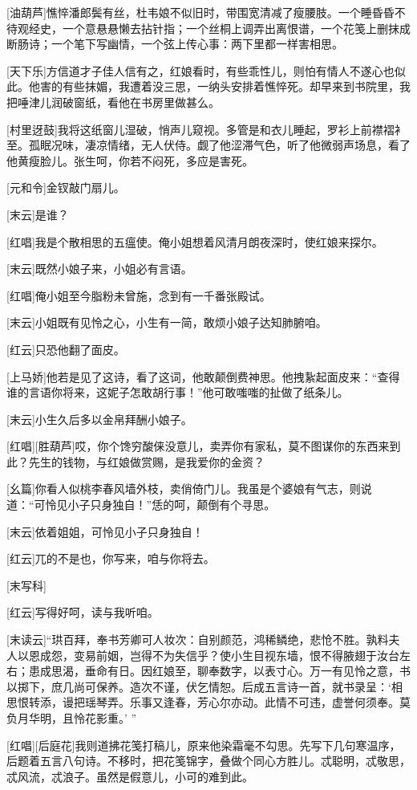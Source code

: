 \documentclass{book}
\begin{document}
[油葫芦]憔悴潘郎鬓有丝，杜韦娘不似旧时，带围宽清减了瘦腰肢。一个睡昏昏不待观经史，一个意悬悬懒去拈针指；一个丝桐上调弄出离恨谱，一个花笺上删抹成断肠诗；一个笔下写幽情，一个弦上传心事：两下里都一样害相思。

[天下乐]方信道才子佳人信有之，红娘看时，有些乖性儿，则怕有情人不遂心也似此。他害的有些抹媚，我遭着没三思，一纳头安排着憔悴死。却早来到书院里，我把唾津儿润破窗纸，看他在书房里做甚么。

[村里迓鼓]我将这纸窗儿湿破，悄声儿窥视。多管是和衣儿睡起，罗衫上前襟褶衤至。孤眠况味，凄凉情绪，无人伏侍。觑了他涩滞气色，听了他微弱声场息，看了他黄瘦脸儿。张生呵，你若不闷死，多应是害死。

[元和令]金钗敲门扇儿。

[末云]是谁？

[红唱]我是个散相思的五瘟使。俺小姐想着风清月朗夜深时，使红娘来探尔。

[末云]既然小娘子来，小姐必有言语。

[红唱]俺小姐至今脂粉未曾施，念到有一千番张殿试。

[末云]小姐既有见怜之心，小生有一简，敢烦小娘子达知肺腑咱。

[红云]只恐他翻了面皮。

[上马娇]他若是见了这诗，看了这词，他敢颠倒费神思。他拽紥起面皮来：``查得谁的言语你将来，这妮子怎敢胡行事！''他可敢嗤嗤的扯做了纸条儿。

[末云]小生久后多以金帛拜酬小娘子。

[红唱][胜葫芦]哎，你个馋穷酸俫没意儿，卖弄你有家私，莫不图谋你的东西来到此？先生的钱物，与红娘做赏赐，是我爱你的金资？

[幺篇]你看人似桃李春风墙外枝，卖俏倚门儿。我虽是个婆娘有气志，则说道：``可怜见小子只身独自！''恁的呵，颠倒有个寻思。

[末云]依着姐姐，可怜见小子只身独自！

[红云]兀的不是也，你写来，咱与你将去。

[末写科]

[红云]写得好呵，读与我听咱。

[末读云]``珙百拜，奉书芳卿可人妆次：自别颜范，鸿稀鳞绝，悲怆不胜。孰料夫人以恩成怨，变易前姻，岂得不为失信乎？使小生目视东墙，恨不得腋翅于汝台左右；患成思渴，垂命有日。因红娘至，聊奉数字，以表寸心。万一有见怜之意，书以掷下，庶几尚可保养。造次不谨，伏乞情恕。后成五言诗一首，就书录呈：`相思恨转添，谩把瑶琴弄。乐事又逢春，芳心尔亦动。此情不可违，虚誉何须奉。莫负月华明，且怜花影重。' ''

[红唱][后庭花]我则道拂花笺打稿儿，原来他染霜毫不勾思。先写下几句寒温序，后题着五言八句诗。不移时，把花笺锦字，叠做个同心方胜儿。忒聪明，忒敬思，忒风流，忒浪子。虽然是假意儿，小可的难到此。
\end{document}
